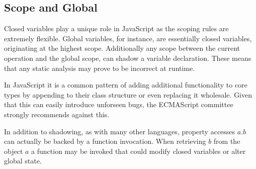 \subsection{Scope and Global}

Closed variables play a unique role in JavaScript as the scoping rules are extremely flexible.  Global variables, for instance, are essentially closed variables, originating at the highest scope.  Additionally any scope between the current operation and the global scope, can shadow a variable declaration.  These means that any static analysis may prove to be incorrect at runtime.  

In JavaScript it is a common pattern of adding additional functionality to core types by appending to their class structure or even replacing it wholesale.  Given that this can easily introduce unforseen bugs, the ECMAScript committee strongly recommends against this. %

In addition to shadowing, as with many other languages, property accesses $a.b$ can actually be backed by a function invocation.  When retrieving $b$ from the object $a$ a function may be invoked that could modify closed variables or alter global state.  
